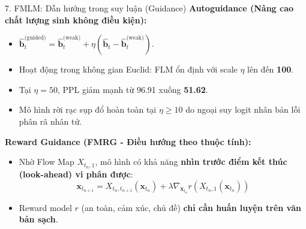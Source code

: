 \begin{frame}{7. FMLM: Dẫn hướng trong suy luận (Guidance)}
    \textbf{Autoguidance (Nâng cao chất lượng sinh không điều kiện):}
    \begin{itemize}
        \item $\hat{\mathbf{b}}_t^{\text{(guided)}} = \hat{\mathbf{b}}_t^{\text{(weak)}} + \eta (\hat{\mathbf{b}}_t - \hat{\mathbf{b}}_t^{\text{(weak)}})$.
        \item Hoạt động trong không gian Euclid: FLM ổn định với scale $\eta$ lên đến \textbf{100}.
        \item Tại $\eta = 50$, PPL giảm mạnh từ 96.91 xuống \textbf{51.62}.
        \item Mô hình rời rạc sụp đổ hoàn toàn tại $\eta \ge 10$ do ngoại suy logit nhân bản lỗi phân rã nhân tử.
    \end{itemize}
    \vspace{0.2cm}
    \textbf{Reward Guidance (FMRG - Điều hướng theo thuộc tính):}
    \begin{itemize}
        \item Nhờ Flow Map $X_{t_n, 1}$, mô hình có khả năng \textbf{nhìn trước điểm kết thúc (look-ahead) vi phân được}:
        $$\mathbf{x}_{t_{n+1}} = X_{t_n, t_{n+1}}(\mathbf{x}_{t_n}) + \lambda \nabla_{\mathbf{x}_{t_n}} r\left( X_{t_n, 1}(\mathbf{x}_{t_n}) \right)$$
        \item Reward model $r$ (an toàn, cảm xúc, chủ đề) \textbf{chỉ cần huấn luyện trên văn bản sạch}.
    \end{itemize}
\end{frame}

